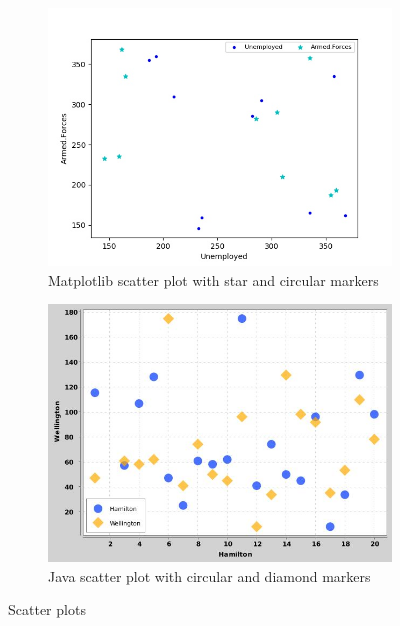 \documentclass[12pt, a4paper,oneside]{report}
\begin{document}
\begin{figure}[!htbp]
	\begin{subfigure}{.5\textwidth}
		\centering
		\includegraphics[width=.8\linewidth]{scatter1}
		\caption{Matplotlib scatter plot with star and circular markers }
		\label{fig:fig1}
	\end{subfigure}%
	\begin{subfigure}{.5\textwidth}
		\centering
		\includegraphics[width=.8\linewidth]{scatter2}
		\caption{Java scatter plot with circular and diamond markers}
		\label{fig:fig2}
	\end{subfigure}
	\caption{Scatter plots}
	\label{fig:fig11}
\end{figure}
\end{document}
